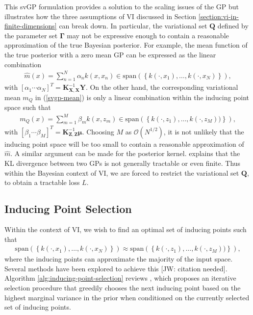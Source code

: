 \documentclass{article}
\newcommand{\jw}[1]{{\color{gray} [JW: #1]}}
\numberwithin{equation}{section}
\begin{document}
This svGP formulation provides a solution to the scaling issues of the GP but illustrates how the three assumptions of VI discussed in Section \ref{section:vi-in-finite-dimensions} can break down.
In particular, the variational set $\mathbf{Q}$ defined by the parameter set $\boldsymbol{\Gamma}$ may not be expressive enough to contain a reasonable approximation of the true Bayesian posterior.
For example, the mean function of the true posterior with a zero mean GP can be expressed as the linear combination
\begin{align}
    \hat{m}(x) = \sum_{n=1}^{N} \alpha_n k(x, x_n) \in \text{span} \left(\left\{k(\cdot, x_1), \dots, k(\cdot, x_N)\right\}\right),
\end{align}
with $\left[\alpha_1 \cdots \alpha_N\right]^T = \mathbf{K}_{\mathbf{X}, \mathbf{X}}^{-1}\mathbf{Y}$.
On the other hand, the corresponding variational mean $m_Q$ in (\ref{svgp-mean}) is only a linear combination within the inducing point space such that
\begin{align}
    m_Q(x) = \sum_{m=1}^{M} \beta_m k(x, z_m) \in \text{span}\left(\left\{k(\cdot, z_1), \dots, k(\cdot, z_M))\right\}\right),
\end{align}
with $\left[\beta_1 \cdots \beta_M\right]^T = \mathbf{K}_{\mathbf{Z}, \mathbf{Z}}^{-1}\boldsymbol{\mu}$.
Choosing $M$ as $\mathcal{O}(N^{1/2})$, it is not unlikely that the inducing point space will be too small to contain a reasonable approximation of $\hat{m}$.
A similar argument can be made for the posterior kernel.
\cite{wild2022generalized} explains that the KL divergence between two GPs is not generally tractable or even finite.
Thus within the Bayesian context of VI, we are forced to restrict the variational set $\boldsymbol{Q}$, to obtain a tractable loss $L$.

\subsection{Inducing Point Selection}\label{section:inducing-point-selection}
Within the context of VI, we wish to find an optimal set of inducing points such that
\begin{align}
    \text{span} \left(\left\{k(\cdot, x_1), \dots, k(\cdot, x_N)\right\}\right) \approx \text{span}\left(\left\{k(\cdot, z_1), \dots, k(\cdot, z_M))\right\}\right),
\end{align}
where the inducing points can approximate the majority of the input space. Several methods have been explored to achieve this \jw{citation needed}.
Algorithm \ref{alg:inducing-point-selection} reviews \cite{burt2020convergence}, which proposes an iterative selection procedure that greedily chooses the next inducing point based on the highest marginal variance in the prior when conditioned on the currently selected set of inducing points.
\end{document}
